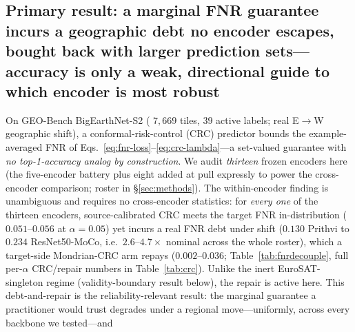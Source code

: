 \documentclass[journal]{IEEEtran}
\renewcommand{\_}{\textunderscore\allowbreak}
\begin{document}
\subsection{Primary result: a marginal FNR guarantee incurs a geographic debt no encoder escapes, bought back with larger prediction sets---accuracy is only a weak, directional guide to which encoder is most robust}
On GEO-Bench BigEarthNet-S2 ( $7{,}669$ tiles, $39$ active labels; real E$\to$W
geographic shift), a conformal-risk-control (CRC) predictor \citep{angelopoulos2024crc} bounds the
example-averaged FNR of Eqs.~\eqref{eq:fnr-loss}--\eqref{eq:crc-lambda}---a set-valued guarantee with \emph{no top-1-accuracy analog by construction}.
We audit \emph{thirteen} frozen encoders here (the five-encoder battery plus eight added at pull
expressly to power the cross-encoder comparison; roster in \S\ref{sec:methods}).
The within-encoder finding is unambiguous and requires no cross-encoder statistics: for \emph{every one}
of the thirteen encoders, source-calibrated CRC meets the target FNR in-distribution ($0.051$--$0.056$ at
$\alpha{=}0.05$) yet incurs a real FNR debt under shift ($0.130$ Prithvi to $0.234$ ResNet50-MoCo, i.e.\
$2.6$--$4.7\times$ nominal across the whole roster), which a target-side Mondrian-CRC arm repays
($0.002$--$0.036$; Table~\ref{tab:fnrdecouple}, full per-$\alpha$ CRC/repair numbers in
Table~\ref{tab:crc}). Unlike the inert EuroSAT-singleton regime (validity-boundary result below), the
repair is active here. This debt-and-repair is the reliability-relevant result: the marginal guarantee a
practitioner would trust degrades under a regional move---uniformly, across every backbone we tested---and
\end{document}
